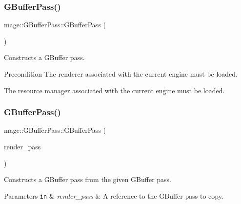 \subsubsection{\texorpdfstring{G\+Buffer\+Pass()}{GBufferPass()}\hspace{0.1cm}{\footnotesize\ttfamily [1/3]}}
{\footnotesize\ttfamily mage\+::\+G\+Buffer\+Pass\+::\+G\+Buffer\+Pass (\begin{DoxyParamCaption}{ }\end{DoxyParamCaption})}

Constructs a G\+Buffer pass.

\begin{DoxyPrecond}{Precondition}
The renderer associated with the current engine must be loaded. 

The resource manager associated with the current engine must be loaded. 
\end{DoxyPrecond}
\hypertarget{classmage_1_1_g_buffer_pass_a3b9f59097aef9175f942c9c9424d0dab}{}\label{classmage_1_1_g_buffer_pass_a3b9f59097aef9175f942c9c9424d0dab} 
\subsubsection{\texorpdfstring{G\+Buffer\+Pass()}{GBufferPass()}\hspace{0.1cm}{\footnotesize\ttfamily [2/3]}}
{\footnotesize\ttfamily mage\+::\+G\+Buffer\+Pass\+::\+G\+Buffer\+Pass (\begin{DoxyParamCaption}\item[{const \hyperlink{classmage_1_1_g_buffer_pass}{G\+Buffer\+Pass} \&}]{render\+\_\+pass }\end{DoxyParamCaption})\hspace{0.3cm}{\ttfamily [delete]}}

Constructs a G\+Buffer pass from the given G\+Buffer pass.


\begin{DoxyParams}[1]{Parameters}
\mbox{\tt in}  & {\em render\+\_\+pass} & A reference to the G\+Buffer pass to copy. \\
\hline
\end{DoxyParams}
\hypertarget{classmage_1_1_g_buffer_pass_a61a520a53c7a8029280eb1fc62d71ce6}{}\label{classmage_1_1_g_buffer_pass_a61a520a53c7a8029280eb1fc62d71ce6} 

